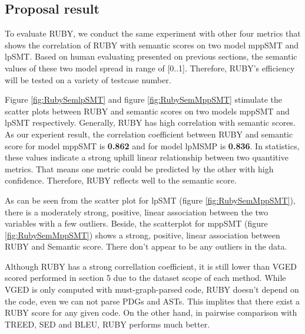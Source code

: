 \subsection{Proposal result}
To evaluate RUBY, we conduct the same experiment with other four metrics that shows the correlation of RUBY with semantic scores on two model mppSMT and lpSMT. Based on human evaluating presented on previous sections, the semantic values of these two model spread in range of [0..1]. Therefore, RUBY's efficiency will be tested on a variety of testcase number.  	


Figure \ref{fig:RubySemlpSMT} and figure \ref{fig:RubySemMppSMT} stimulate the scatter plots between RUBY and semantic scores on two models mppSMT and lpSMT respectively. Generally, RUBY has high correlation with semantic scores. As our experient result, the correlation coefficient between RUBY and semantic score for model mppSMT is \textbf{0.862} and for model lpMSMP is \textbf{0.836}. In statistics, these values indicate a strong uphill linear relationship between two quantitive metrics. That means one metric could be predicted by the other with high confidence. Therefore, RUBY reflects well to the semantic score.


As can be seen from the scatter plot for lpSMT (figure \ref{fig:RubySemMppSMT}), there is a moderately strong, positive, linear association between the two variables with a few outliers.  
Beside, the scatterplot for mppSMT (figure \ref{fig:RubySemMppSMT}) shows a strong, positive, linear association between RUBY and Semantic score. There don't appear to be any outliers in the data.

Although RUBY has a strong correllation coefficient, it is still lower than VGED scored performed in section 5 due to the dataset scope of each method. While VGED is only computed with must-graph-parsed code, RUBY doesn't depend on the code, even we can not parse PDGs and ASTs. This implites that there exist a RUBY score for any given code. On the other hand, in pairwise comparison with TREED, SED and BLEU, RUBY performs much better.
	    
  			